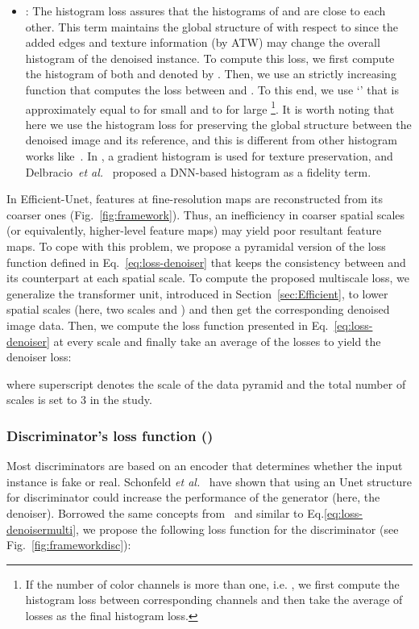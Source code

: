 \documentclass[journal,twoside,web]{ieeecolor}
\def\etal{\textit{et al.}}
\begin{document}
\begin{itemize}
\item[] : The histogram loss assures that the histograms of  and  are close to each other. This term maintains the global structure of  with respect to  since the added edges and texture information (by ATW) may change the overall histogram of the denoised instance. To compute this loss, we first compute the histogram of both  and  denoted by . Then, we use an strictly increasing function that computes the loss between  and . To this end, we use `' that is approximately equal to  for small  and to  for large \footnote{If the number of color channels is more than one, i.e. , we first compute the histogram loss between corresponding channels and then take the average of losses as the final histogram loss.}. It is worth noting that here we use the histogram loss for preserving the global structure between the denoised image and its reference, and this is different from other histogram works like~\cite{zuo2013texture,talebi2021projected}. In \cite{zuo2013texture}, a gradient histogram is used for texture preservation, and Delbracio~\etal~\cite{talebi2021projected} proposed a DNN-based histogram as a fidelity term.
\end{itemize}
In Efficient-Unet, features at fine-resolution maps are reconstructed from its coarser ones (Fig.~\ref{fig:framework}). Thus, an inefficiency in coarser spatial scales (or equivalently, higher-level feature maps) may yield poor resultant feature maps. To cope with this problem, we propose a pyramidal version of the loss function defined in Eq.~\ref{eq:loss-denoiser} that keeps the consistency between  and its counterpart  at each spatial scale. To compute the proposed multiscale loss, we generalize the transformer unit, introduced in Section~\ref{sec:Efficient}, to lower spatial scales (here, two scales  and ) and then get the corresponding denoised image data. Then, we compute the loss function presented in Eq.~\ref{eq:loss-denoiser} at every scale and finally take an average of the losses to yield the denoiser loss:
 
where superscript  denotes the scale of the data pyramid and the total number of scales is set to 3 in the study. 
\subsubsection{Discriminator's loss function ()} Most discriminators are based on an encoder that determines whether the input instance is fake or real. Schonfeld \etal~\cite{schonfeld2020u} have shown that using an Unet structure for discriminator could increase the performance of the generator (here, the denoiser). Borrowed the same concepts from~\cite{schonfeld2020u} and similar to Eq.\ref{eq:loss-denoisermulti}, we propose the following loss function for the discriminator (see Fig.~\ref{fig:frameworkdisc}):
\end{document}
